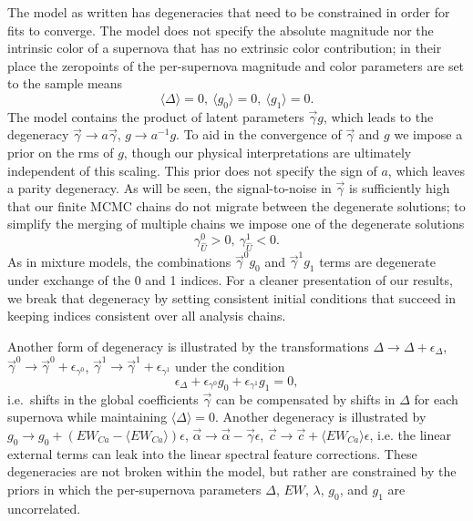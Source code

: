 \documentclass[trackchanges]{aastex61}   	%
\begin{document}
The model as written has degeneracies that need to be constrained in order for fits to converge.
The model does not specify the absolute magnitude nor the intrinsic color of a supernova that has no extrinsic color contribution;
in their place the zeropoints of the per-supernova magnitude and color parameters are set to the sample means
\begin{equation}
\langle \Delta \rangle=0,\ \langle g_0 \rangle=0,\ \langle g_1 \rangle=0.
\label{zero:eqn}
\end{equation}
The model contains the product of latent parameters
$\vec{\gamma} g$, which leads to the degeneracy $\vec{\gamma} \rightarrow a\vec{\gamma}$, $g \rightarrow a^{-1} g$.
To aid in the convergence of $\vec{\gamma}$ and $g$ we impose a prior on the rms of $g$, though
our physical interpretations are ultimately independent of this scaling.
This prior does not specify the sign of $a$, which leaves a parity degeneracy.  As will be seen, the signal-to-noise in $\vec{\gamma}$ is sufficiently
high that our finite MCMC chains do not migrate between the degenerate solutions; to simplify the merging of multiple chains
we impose one of the degenerate solutions
\begin{equation}
\gamma^0_{\hat{U}} > 0,\ \gamma^1_{\hat{U}} < 0.
\end{equation}
As  in mixture models, the combinations $\vec{\gamma}^0 g_0$ and $\vec{\gamma}^1 g_1$ terms are degenerate under exchange of the 0 and 1 indices. For a cleaner presentation of our results, 
we break that degeneracy  by setting consistent initial conditions that succeed in keeping indices consistent over all analysis chains.  


Another form of degeneracy is illustrated by the  transformations $\Delta \rightarrow \Delta  + \epsilon_\Delta$,
 $\vec{\gamma}^0 \rightarrow \vec{\gamma}^0  + \epsilon_{\gamma^0}$, $\vec{\gamma}^1 \rightarrow \vec{\gamma}^1 + \epsilon_{\gamma^1}$
 under the condition
$$
\epsilon_\Delta  +  \epsilon_{\gamma^0} g_0+  \epsilon_{\gamma^1} g_1=0,
$$
i.e.\ shifts in the global coefficients $\vec{\gamma}$ can be compensated by shifts in 
$\Delta$
for each supernova while maintaining 
$\langle \Delta \rangle=0$.
Another degeneracy is illustrated by $g_0 \rightarrow g_0 + (EW_{Ca}-\langle EW_{Ca}\rangle)\epsilon$,
$\vec{\alpha} \rightarrow \vec{\alpha} - \vec{\gamma} \epsilon$, $\vec{c} \rightarrow \vec{c} + \langle EW_{Ca}\rangle \epsilon$, i.e. the
linear external terms can leak into the linear spectral feature corrections.
These degeneracies are not broken within the model, but rather are constrained by the priors in which the
per-supernova parameters
$\Delta$, $EW$, $\lambda$, $g_0$, and $g_1$ are uncorrelated. 
\end{document}
